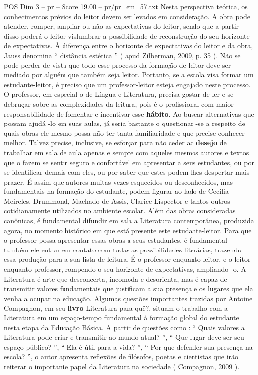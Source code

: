 \begin{textsample}{POS Dim 3 – pr – Score 19.00 – pr/pr\_em\_57.txt}
Nesta perspectiva teórica, os conhecimentos prévios do leitor devem ser levados em consideração.
A obra pode atender, romper, ampliar ou não as expectativas do leitor, sendo que a partir disso poderá o leitor vislumbrar a possibilidade de reconstrução do seu horizonte de expectativas.
À diferença entre o horizonte de expectativas do leitor e da obra, Jauss denomina “ distância estética ” ( apud Zilberman, 2009, p. 35 ).
Não se pode perder de vista que todo esse processo da formação de leitor deve ser mediado por alguém que também seja leitor.
Portanto, se a escola visa formar um estudante-leitor, é preciso que um professor-leitor esteja engajado neste processo.
O professor, em especial o de Língua e Literatura, precisa gostar de ler e se debruçar sobre as complexidades da leitura, pois é o profissional com maior responsabilidade de fomentar e incentivar esse \textbf{hábito}.
Ao buscar alternativas que possam ajudá -lo em suas aulas, já seria bastante o questionar -se a respeito de quais obras ele mesmo possa não ter tanta familiaridade e que precise conhecer melhor.
Talvez precise, inclusive, se esforçar para não ceder ao \textbf{desejo} de trabalhar em sala de aula apenas e sempre com aqueles mesmos autores e textos que o fazem se sentir seguro e confortável em apresentar a seus estudantes, ou por se identificar demais com eles, ou por saber que estes podem lhes despertar mais prazer.
É assim que autores muitas vezes esquecidos ou desconhecidos, mas fundamentais na formação do estudante, podem figurar ao lado de Cecília Meireles, Drummond, Machado de Assis, Clarice Lispector e tantos outros cotidianamente utilizados no ambiente escolar.
Além das obras consideradas canônicas, é fundamental difundir em sala a Literatura contemporânea, produzida agora, no momento histórico em que está presente este estudante-leitor.
Para que o professor possa apresentar essas obras a seus estudantes, é fundamental também ele entrar em contato com todas as possibilidades literárias, trazendo essa produção para a sua lista de leitura.
É o professor enquanto leitor, e o leitor enquanto professor, rompendo o seu horizonte de expectativas, ampliando -o.
A Literatura é arte que desconcerta, incomoda e desorienta, mas é capaz de transmitir valores fundamentais que justificam a sua presença e os lugares que ela venha a ocupar na educação.
Algumas questões importantes trazidas por Antoine Compagnon, em seu \textbf{livro} Literatura para quê?, situam o trabalho com a Literatura em um espaço-tempo fundamental à formação global do estudante nesta etapa da Educação Básica.
A partir de questões como : “ Quais valores a Literatura pode criar e transmitir ao mundo atual? ”, “ Que lugar deve ser seu espaço público? ”, “ Ela é útil para a vida? ”, “ Por que defender sua presença na escola? ”, o autor apresenta reflexões de filósofos, poetas e cientistas que irão reiterar o importante papel da Literatura na sociedade ( Compagnon, 2009 ).

\end{textsample}
